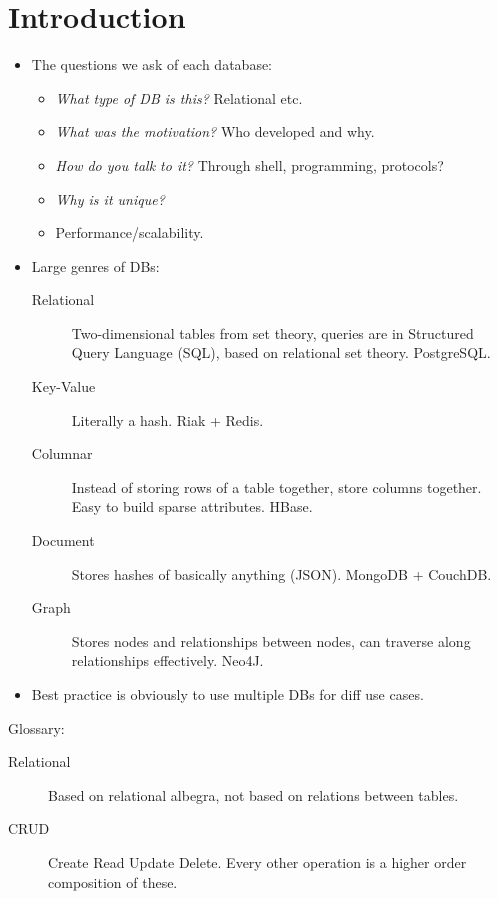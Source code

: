 \documentclass[10pt]{article}
\begin{document}
\onehalfspacing

\pagestyle{fancy}
\cfoot{\thepage/\pageref{LastPage}}

\section{Introduction}

\begin{itemize}
    \item The questions we ask of each database:
        \begin{itemize}
            \item \emph{What type of DB is this?} Relational etc.
            \item \emph{What was the motivation?} Who developed and why.
            \item \emph{How do you talk to it?} Through shell, programming,
                protocols?
            \item \emph{Why is it unique?}
            \item Performance/scalability.
        \end{itemize}
    \item Large genres of DBs:
        \begin{description}
            \item[Relational] Two-dimensional tables from set theory, queries
                are in Structured Query Language (SQL), based on relational set
                theory. PostgreSQL.\@
            \item[Key-Value] Literally a hash. Riak + Redis.
            \item[Columnar] Instead of storing rows of a table together, store
                columns together. Easy to build sparse attributes. HBase.
            \item[Document] Stores hashes of basically anything (JSON). MongoDB
                + CouchDB.\@
            \item[Graph] Stores nodes and relationships between nodes, can
                traverse along relationships effectively. Neo4J.
        \end{description}
    \item Best practice is obviously to use multiple DBs for diff use cases.
\end{itemize}

Glossary:
\begin{description}
    \item[Relational] Based on relational albegra, not based on relations
        between tables.
    \item[CRUD] Create Read Update Delete. Every other operation is a higher
        order composition of these.
\end{description}
\end{document}
